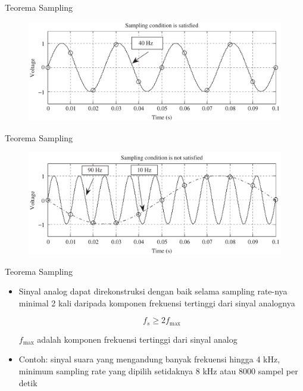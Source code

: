 \documentclass[pdflatex,compress,mathserif]{beamer}
\begin{document}
\begin{frame}{Teorema Sampling}
    \begin{figure}
        \includegraphics[width=\linewidth]{./img/img04.png}
    \end{figure}
\end{frame}

\begin{frame}{Teorema Sampling}
    \begin{figure}
        \includegraphics[width=\linewidth]{./img/img05.png}
    \end{figure}
\end{frame}

\begin{frame}{Teorema Sampling}
    \begin{itemize}
        \item Sinyal analog dapat direkonstruksi dengan baik selama sampling rate-nya minimal 2 kali daripada komponen frekuensi tertinggi dari sinyal analognya

        \begin{equation}
            f_s \geq 2 f_\text{max}
        \end{equation}

        $f_\text{max}$ adalah komponen frekuensi tertinggi dari sinyal analog
        \item Contoh: sinyal suara yang mengandung banyak frekuensi hingga 4 kHz, minimum sampling rate yang dipilih setidaknya 8 kHz atau 8000 sampel per detik
    \end{itemize}
\end{frame}
\end{document}
